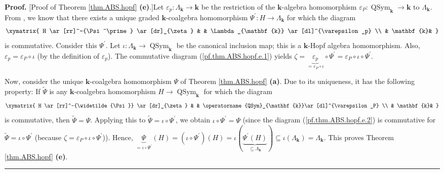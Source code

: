 \documentclass[numbers=enddot,12pt,final,onecolumn,notitlepage,abstracton]{scrartcl}%
\theoremstyle{definition}
\newenvironment{proof}[1][Proof]{\noindent\textbf{#1.} }{\ \rule{0.5em}{0.5em}}
\newcommand{\kk}{\mathbf{k}}
\newcommand{\QSym}{\operatorname{QSym}_{\mathbf{k}}}
\begin{document}
\begin{proof}
[Proof of Theorem \ref{thm.ABS.hopf} \textbf{(e)}.]Let $\varepsilon
_{p}:\Lambda_{\mathbf{k}}\rightarrow\mathbf{k}$ be the restriction of the
$\mathbf{k}$-algebra homomorphism $\varepsilon_{P}:\operatorname*{QSym}%
\nolimits_{\mathbf{k}}\rightarrow\mathbf{k}$ to $\Lambda_{\mathbf{k}}$. From
\cite[Theorem 4.3]{ABS}, we know that there exists a unique graded
$\mathbf{k}$-coalgebra homomorphism $\Psi^{\prime}:H\rightarrow\Lambda
_{\mathbf{k}}$ for which the diagram%
\begin{equation}%
\xymatrix{
H \ar[rr]^-{\Psi^\prime} \ar[dr]_{\zeta} & & \Lambda_{\kk} \ar
[dl]^{\varepsilon_p} \\
& \kk&
}
\label{pf.thm.ABS.hopf.e.1}%
\end{equation}
is commutative. Consider this $\Psi^{\prime}$. Let $\iota:\Lambda_{\mathbf{k}%
}\rightarrow\operatorname*{QSym}\nolimits_{\mathbf{k}}$ be the canonical
inclusion map; this is a $\mathbf{k}$-Hopf algebra homomorphism. Also,
$\varepsilon_{p}=\varepsilon_{P}\circ\iota$ (by the definition of
$\varepsilon_{p}$). The commutative diagram (\ref{pf.thm.ABS.hopf.e.1}) yields
$\zeta=\underbrace{\varepsilon_{p}}_{=\varepsilon_{P}\circ\iota}\circ
\Psi^{\prime}=\varepsilon_{P}\circ\iota\circ\Psi^{\prime}$.

Now, consider the unique $\mathbf{k}$-coalgebra homomorphism $\Psi$ of Theorem
\ref{thm.ABS.hopf} \textbf{(a)}. Due to its uniqueness, it has the following
property: If $\widetilde{\Psi}$ is any $\mathbf{k}$-coalgebra homomorphism
$H\rightarrow\operatorname*{QSym}\nolimits_{\mathbf{k}}$ for which the diagram%
\begin{equation}%
\xymatrix{
H \ar[rr]^-{\widetilde{\Psi}} \ar[dr]_{\zeta} & & \QSym\ar[dl]^{\varepsilon_P}
\\
& \kk&
}
\label{pf.thm.ABS.hopf.e.2}%
\end{equation}
is commutative, then $\widetilde{\Psi}=\Psi$. Applying this to
$\widetilde{\Psi}=\iota\circ\Psi^{\prime}$, we obtain $\iota\circ\Psi^{\prime
}=\Psi$ (since the diagram (\ref{pf.thm.ABS.hopf.e.2}) is commutative for
$\widetilde{\Psi}=\iota\circ\Psi^{\prime}$ (because $\zeta=\varepsilon
_{P}\circ\iota\circ\Psi^{\prime}$)). Hence, $\underbrace{\Psi}_{=\iota
\circ\Psi^{\prime}}\left(  H\right)  =\left(  \iota\circ\Psi^{\prime}\right)
\left(  H\right)  =\iota\left(  \underbrace{\Psi^{\prime}\left(  H\right)
}_{\subseteq\Lambda_{\mathbf{k}}}\right)  \subseteq\iota\left(  \Lambda
_{\mathbf{k}}\right)  =\Lambda_{\mathbf{k}}$. This proves Theorem
\ref{thm.ABS.hopf} \textbf{(e)}.
\end{proof}
\end{document}
